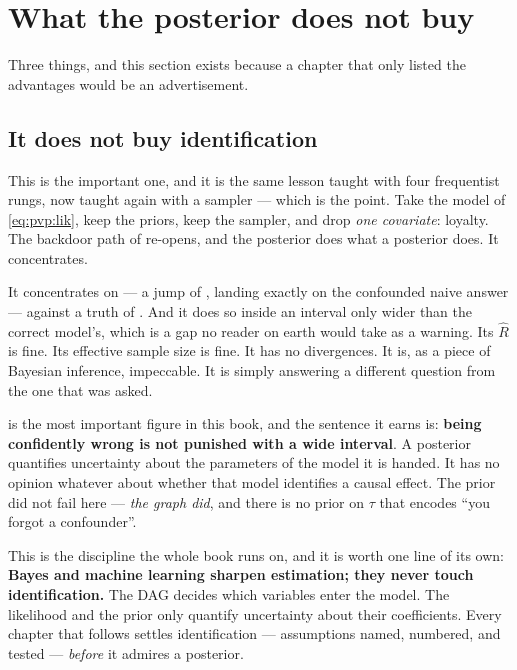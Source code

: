 \section{What the posterior does not buy}
\label{sec:pvp:notbuy}

Three things, and this section exists because a chapter that only listed the advantages would be
an advertisement.

\subsection*{It does not buy identification}

This is the important one, and it is the same lesson  taught with four frequentist rungs,
now taught again with a sampler --- which is the point. Take the model of \cref{eq:pvp:lik}, keep
the priors, keep the sampler, and drop \emph{one covariate}: loyalty. The backdoor path of
 re-opens, and the posterior does what a posterior does. It concentrates.

It concentrates on \eur{\nbZeroNoadjMean} --- a jump of \eur{\nbZeroNoadjJump}, landing exactly on
the confounded naive answer --- against a truth of \eur{\nbZeroTrueDag}. And it does so inside an
interval only \pc{\nbZeroNoadjWiderPct} wider than the correct model's, which is a gap no reader on
earth would take as a warning. Its $\hat R$ is fine. Its effective sample size is fine. It has no
divergences. It is, as a piece of Bayesian inference, impeccable. It is simply answering a
different question from the one that was asked.



 is the most important figure in this book, and the sentence it earns is:
\textbf{being confidently wrong is not punished with a wide interval}. A posterior quantifies
uncertainty about the parameters of the model it is handed. It has no opinion whatever about
whether that model identifies a causal effect. The prior did not fail here --- \emph{the graph
did}, and there is no prior on $\tau$ that encodes ``you forgot a confounder''.

This is the discipline the whole book runs on, and it is worth one line of its own: \textbf{Bayes
and machine learning sharpen estimation; they never touch identification.} The DAG decides which
variables enter the model. The likelihood and the prior only quantify uncertainty about their
coefficients. Every chapter that follows settles identification --- assumptions named, numbered,
and tested --- \emph{before} it admires a posterior.

